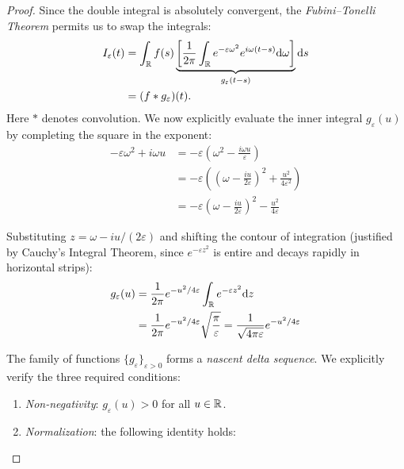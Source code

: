 \begin{proof}
Since the double integral is absolutely convergent, the \textit{Fubini--Tonelli Theorem} permits us to swap the integrals:
\begin{equation}
\begin{aligned}
I_\varepsilon(t)
    &= \int_{\mathbb{R}} f(s) \underbrace{ \left[ \frac{1}{2\pi} \int_{\mathbb{R}} e^{-\varepsilon \omega^2} e^{i\omega(t-s)} \mathrm{d} \omega \right] }_{g_\varepsilon(t-s)} \mathrm{d} s \\
    &= (f * g_\varepsilon)(t).
\end{aligned}
\end{equation}
Here $*$ denotes convolution. We now explicitly evaluate the inner integral $g_\varepsilon(u)$ by completing the square in the exponent:
\begin{equation}
\begin{aligned}
    -\varepsilon \omega^2 + i\omega u
    &= -\varepsilon \left( \omega^2 - \frac{i\omega u}{\varepsilon} \right) \\
    &= -\varepsilon \left( \left(\omega - \frac{iu}{2\varepsilon}\right)^2 + \frac{u^2}{4\varepsilon^2} \right) \\
    &= -\varepsilon \left(\omega - \frac{iu}{2\varepsilon}\right)^2 - \frac{u^2}{4\varepsilon}
    \end{aligned}
\end{equation}

Substituting $z = \omega - iu/(2\varepsilon)$ and shifting the contour of integration (justified by Cauchy's Integral Theorem, since $e^{-\varepsilon z^2}$ is entire and decays rapidly in horizontal strips):
\begin{equation}
\begin{aligned}
g_\varepsilon(u)
    &= \frac{1}{2\pi} e^{-u^2 / 4\varepsilon} \int_{\mathbb{R}} e^{-\varepsilon z^2} \mathrm{d} z \\
    &= \frac{1}{2\pi} e^{-u^2 / 4\varepsilon} \sqrt{\frac{\pi}{\varepsilon}}
    = \frac{1}{\sqrt{4\pi\varepsilon}} e^{-u^2 / 4\varepsilon}
    \end{aligned}
\end{equation}

The family of functions $\{g_\varepsilon\}_{\varepsilon > 0}$ forms a \textit{nascent delta sequence}. We explicitly verify the three required conditions:
\begin{enumerate}
\item \textit{Non-negativity}: $g_\varepsilon(u) > 0$ for all $u \in \mathbb{R}$.
\item \textit{Normalization}: the following identity holds:


\end{enumerate}
\end{proof}
